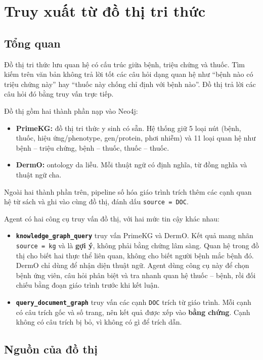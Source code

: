 \section{Truy xuất từ đồ thị tri thức}
\label{sec:truy-xuat-do-thi}

\subsection{Tổng quan}

Đồ thị tri thức lưu quan hệ có cấu trúc giữa bệnh, triệu chứng và thuốc. Tìm kiếm trên văn bản không trả lời tốt các câu hỏi dạng quan hệ như ``bệnh nào có triệu chứng này'' hay ``thuốc này chống chỉ định với bệnh nào''. Đồ thị trả lời các câu hỏi đó bằng truy vấn trực tiếp.

Đồ thị gồm hai thành phần nạp vào Neo4j:
\begin{itemize}
  \item \textbf{PrimeKG:} đồ thị tri thức y sinh có sẵn. Hệ thống giữ 5 loại nút (bệnh, thuốc, hiệu ứng/phenotype, gen/protein, phơi nhiễm) và 11 loại quan hệ như bệnh -- triệu chứng, bệnh -- thuốc, thuốc -- thuốc.
  \item \textbf{DermO:} ontology da liễu. Mỗi thuật ngữ có định nghĩa, từ đồng nghĩa và thuật ngữ cha.
\end{itemize}

Ngoài hai thành phần trên, pipeline số hóa giáo trình trích thêm các cạnh quan hệ từ sách và ghi vào cùng đồ thị, đánh dấu \texttt{source = DOC}.

Agent có hai công cụ truy vấn đồ thị, với hai mức tin cậy khác nhau:
\begin{itemize}
  \item \textbf{\texttt{knowledge\_graph\_query}} truy vấn PrimeKG và DermO. Kết quả mang nhãn \texttt{source = kg} và là \textbf{gợi ý}, không phải bằng chứng lâm sàng. Quan hệ trong đồ thị cho biết hai thực thể liên quan, không cho biết người bệnh mắc bệnh đó. DermO chỉ dùng để nhận diện thuật ngữ. Agent dùng công cụ này để chọn bệnh ứng viên, câu hỏi phân biệt và tra nhanh quan hệ thuốc -- bệnh, rồi đối chiếu bằng đoạn giáo trình trước khi kết luận.
  \item \textbf{\texttt{query\_document\_graph}} truy vấn các cạnh \texttt{DOC} trích từ giáo trình. Mỗi cạnh có câu trích gốc và số trang, nên kết quả được xếp vào \textbf{bằng chứng}. Cạnh không có câu trích bị bỏ, vì không có gì để trích dẫn.
\end{itemize}

\subsection{Nguồn của đồ thị}

